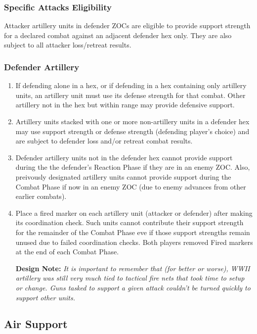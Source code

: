 \subsubsection{\textbf{Specific Attacks Eligibility}}

Attacker artillery units in defender ZOCs are eligible to provide support strength for a declared combat against an adjacent defender hex only. They are also subject to all attacker loss/retreat results.

\subsubsection{\textbf{Defender Artillery}}
\begin{enumerate}[label=\alph*.]
    \item If defending alone in a hex, or if defending in a hex containing only artillery units, an artillery unit must use its defense strength for that combat. Other artillery not in the hex but within range may provide defensive support.
    \item Artillery units stacked with one or more non-artillery units in a defender hex may use support strength or defense strength (defending player's choice) and are subject to defender loss and/or retreat combat results.
    \item Defender artillery units not in the defender hex cannot provide support during the the defender's Reaction Phase if they are in an enemy ZOC. Also, preivously designated artillery units cannot provide support during the Combat Phase if now in an enemy ZOC (due to enemy advances from other earlier combats).
    \item Place a fired marker on each artillery unit (attacker or defender) after making its coordination check. Such units cannot contribute their support strength for the remainder of the Combat Phase eve if those support strengths remain unused due to failed coordination checks. Both players removed Fired markers at the end of each Combat Phase.
    
    \textbf{Design Note:} \textit{It is important to remember that (for better or worse), WWII artillery was still very much tied to tactical fire nets that took time to setup or change. Guns tasked to support a given attack couldn't be turned quickly to support other units.}
\end{enumerate}

\subsection{Air Support}

